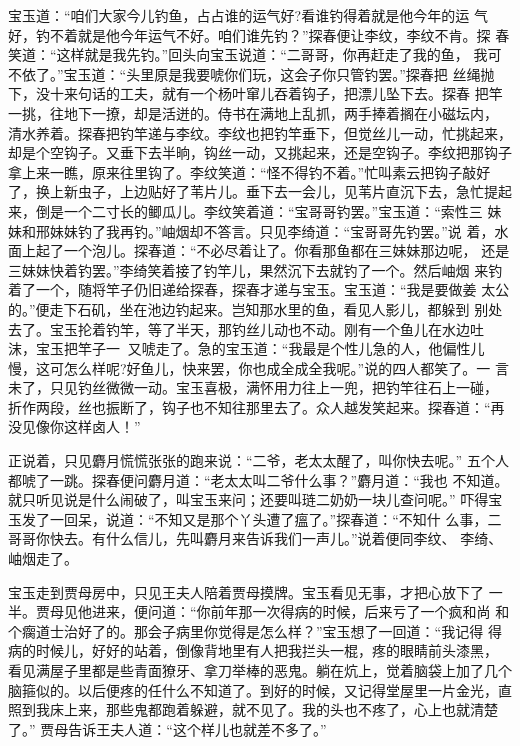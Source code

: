 宝玉道：“咱们大家今儿钓鱼，占占谁的运气好?看谁钓得着就是他今年的运
气好，钓不着就是他今年运气不好。咱们谁先钓？”探春便让李纹，李纹不肯。探
春笑道：“这样就是我先钓。”回头向宝玉说道：“二哥哥，你再赶走了我的鱼，
我可不依了。”宝玉道：“头里原是我要唬你们玩，这会子你只管钓罢。”探春把
丝绳抛下，没十来句话的工夫，就有一个杨叶窜儿吞着钩子，把漂儿坠下去。探春
把竿一挑，往地下一撩，却是活迸的。侍书在满地上乱抓，两手捧着搁在小磁坛内，
清水养着。探春把钓竿递与李纹。李纹也把钓竿垂下，但觉丝儿一动，忙挑起来，
却是个空钩子。又垂下去半晌，钩丝一动，又挑起来，还是空钩子。李纹把那钩子
拿上来一瞧，原来往里钩了。李纹笑道：“怪不得钓不着。”忙叫素云把钩子敲好
了，换上新虫子，上边贴好了苇片儿。垂下去一会儿，见苇片直沉下去，急忙提起
来，倒是一个二寸长的鲫瓜儿。李纹笑着道：“宝哥哥钓罢。”宝玉道：“索性三
妹妹和邢妹妹钓了我再钓。”岫烟却不答言。只见李绮道：“宝哥哥先钓罢。”说
着，水面上起了一个泡儿。探春道：“不必尽着让了。你看那鱼都在三妹妹那边呢，
还是三妹妹快着钓罢。”李绮笑着接了钓竿儿，果然沉下去就钓了一个。然后岫烟
来钓着了一个，随将竿子仍旧递给探春，探春才递与宝玉。宝玉道：“我是要做姜
太公的。”便走下石矶，坐在池边钓起来。岂知那水里的鱼，看见人影儿，都躲到
别处去了。宝玉抡着钓竿，等了半天，那钓丝儿动也不动。刚有一个鱼儿在水边吐
沫，宝玉把竿子一，又唬走了。急的宝玉道：“我最是个性儿急的人，他偏性儿
慢，这可怎么样呢?好鱼儿，快来罢，你也成全成全我呢。”说的四人都笑了。一
言未了，只见钓丝微微一动。宝玉喜极，满怀用力往上一兜，把钓竿往石上一碰，
折作两段，丝也振断了，钩子也不知往那里去了。众人越发笑起来。探春道：“再
没见像你这样卤人！”

正说着，只见麝月慌慌张张的跑来说：“二爷，老太太醒了，叫你快去呢。”
五个人都唬了一跳。探春便问麝月道：“老太太叫二爷什么事？”麝月道：“我也
不知道。就只听见说是什么闹破了，叫宝玉来问；还要叫琏二奶奶一块儿查问呢。”
吓得宝玉发了一回呆，说道：“不知又是那个丫头遭了瘟了。”探春道：“不知什
么事，二哥哥你快去。有什么信儿，先叫麝月来告诉我们一声儿。”说着便同李纹、
李绮、岫烟走了。

宝玉走到贾母房中，只见王夫人陪着贾母摸牌。宝玉看见无事，才把心放下了
一半。贾母见他进来，便问道：“你前年那一次得病的时候，后来亏了一个疯和尚
和个瘸道士治好了的。那会子病里你觉得是怎么样？”宝玉想了一回道：“我记得
得病的时候儿，好好的站着，倒像背地里有人把我拦头一棍，疼的眼睛前头漆黑，
看见满屋子里都是些青面獠牙、拿刀举棒的恶鬼。躺在炕上，觉着脑袋上加了几个
脑箍似的。以后便疼的任什么不知道了。到好的时候，又记得堂屋里一片金光，直
照到我床上来，那些鬼都跑着躲避，就不见了。我的头也不疼了，心上也就清楚了。”
贾母告诉王夫人道：“这个样儿也就差不多了。”

